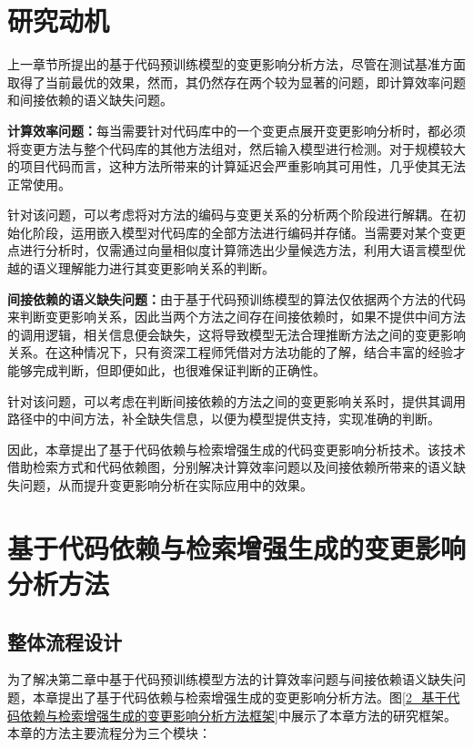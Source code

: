 \section{研究动机}

上一章节所提出的基于代码预训练模型的变更影响分析方法，尽管在测试基准方面取得了当前最优的效果，然而，其仍然存在两个较为显著的问题，即计算效率问题和间接依赖的语义缺失问题。

\textbf{计算效率问题：}每当需要针对代码库中的一个变更点展开变更影响分析时，都必须将变更方法与整个代码库的其他方法组对，然后输入模型进行检测。对于规模较大的项目代码而言，这种方法所带来的计算延迟会严重影响其可用性，几乎使其无法正常使用。

针对该问题，可以考虑将对方法的编码与变更关系的分析两个阶段进行解耦。在初始化阶段，运用嵌入模型对代码库的全部方法进行编码并存储。当需要对某个变更点进行分析时，仅需通过向量相似度计算筛选出少量候选方法，利用大语言模型优越的语义理解能力进行其变更影响关系的判断。

\textbf{间接依赖的语义缺失问题：}由于基于代码预训练模型的算法仅依据两个方法的代码来判断变更影响关系，因此当两个方法之间存在间接依赖时，如果不提供中间方法的调用逻辑，相关信息便会缺失，这将导致模型无法合理推断方法之间的变更影响关系。在这种情况下，只有资深工程师凭借对方法功能的了解，结合丰富的经验才能够完成判断，但即便如此，也很难保证判断的正确性。

针对该问题，可以考虑在判断间接依赖的方法之间的变更影响关系时，提供其调用路径中的中间方法，补全缺失信息，以便为模型提供支持，实现准确的判断。

因此，本章提出了基于代码依赖与检索增强生成的代码变更影响分析技术。该技术借助检索方式和代码依赖图，分别解决计算效率问题以及间接依赖所带来的语义缺失问题，从而提升变更影响分析在实际应用中的效果。


\section{基于代码依赖与检索增强生成的变更影响分析方法}


\subsection{整体流程设计}

为了解决第二章中基于代码预训练模型方法的计算效率问题与间接依赖语义缺失问题，本章提出了基于代码依赖与检索增强生成的变更影响分析方法。图\ref{2_基于代码依赖与检索增强生成的变更影响分析方法框架}中展示了本章方法的研究框架。本章的方法主要流程分为三个模块：

